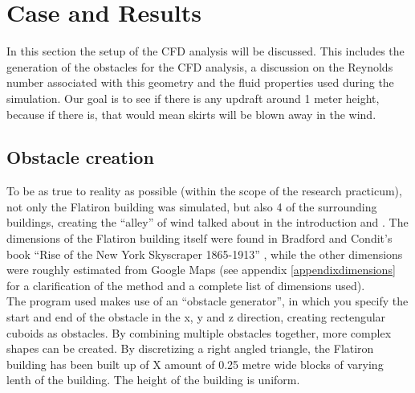 \section{Case and Results}
\label{method}
In this section the setup of the CFD analysis will be discussed. This includes the generation of the obstacles for the CFD analysis, a discussion on the Reynolds number associated with this geometry and the fluid properties used during the simulation. Our goal is to see if there is any updraft around 1 meter height, because if there is, that would mean skirts will be blown away in the wind. 
\subsection{Obstacle creation}
\label{obstacles}
To be as true to reality as possible (within the scope of the research practicum), not only the Flatiron building was simulated, but also 4 of the surrounding buildings, creating the ``alley'' of wind talked about in the introduction and \cite{dresses}. The dimensions of the Flatiron building itself were found in Bradford and Condit's book ``Rise of the New York Skyscraper 1865-1913'' \cite{skyscraper}, while the other dimensions were roughly estimated from Google Maps (see appendix \ref{appendixdimensions} for a clarification of the method and a complete list of dimensions used). \\
\indent %
The program used makes use of an ``obstacle generator'', in which you specify the start and end of the obstacle in the x, y and z direction, creating rectengular cuboids as obstacles. By combining multiple obstacles together, more complex shapes can be created. By discretizing a right angled triangle, the Flatiron building has been built up of X amount of 0.25 metre wide blocks of varying lenth of the building. The height of the building is uniform. 
